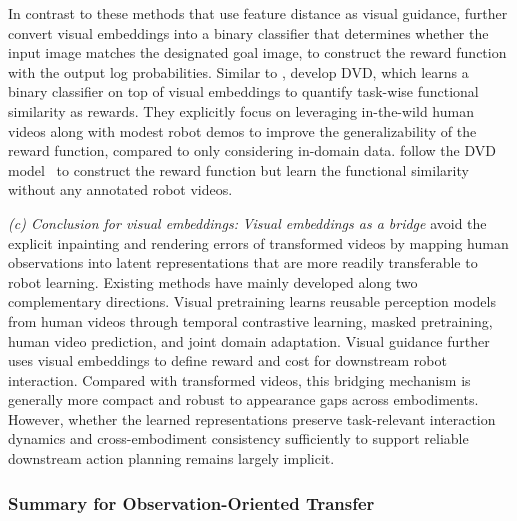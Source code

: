 \documentclass[Afour,sageh,times]{sagej}
\begin{document}
In contrast to these methods that use feature distance as visual guidance, \cite{smith2020avid} further convert visual embeddings into a binary classifier that determines whether the input image matches the designated goal image, to construct the reward function with the output log probabilities. Similar to \cite{smith2020avid}, \cite{chen2021learning} develop DVD, which learns a binary classifier on top of visual embeddings to quantify task-wise functional similarity as rewards. They explicitly focus on leveraging in-the-wild human videos along with modest robot demos to improve the generalizability of the reward function, compared to \cite{smith2020avid} only considering in-domain data. \cite{chane2023learning} follow the DVD model~\citep{chen2021learning} to construct the reward function but learn the functional similarity without any annotated robot videos. 

\textit{(c) Conclusion for visual embeddings:} \textit{Visual embeddings as a bridge} avoid the explicit inpainting and rendering errors of transformed videos by mapping human observations into latent representations that are more readily transferable to robot learning. Existing methods have mainly developed along two complementary directions. Visual pretraining learns reusable perception models from human videos through temporal contrastive learning, masked pretraining, human video prediction, and joint domain adaptation. Visual guidance further uses visual embeddings to define reward and cost for downstream robot interaction. Compared with transformed videos, this bridging mechanism is generally more compact and robust to appearance gaps across embodiments. However, whether the learned representations preserve task-relevant interaction dynamics and cross-embodiment consistency sufficiently to support reliable downstream action planning remains largely implicit.

\subsubsection{Summary for Observation-Oriented Transfer}
\end{document}
